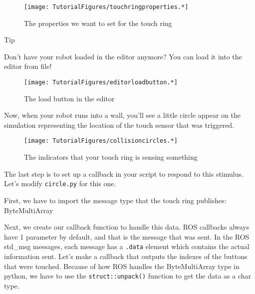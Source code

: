 \begin{figure}
\centering
\texttt{[image: TutorialFigures/touchringproperties.*]}
\caption{The properties we want to set for the touch ring}
\end{figure}

Tip

Don't have your robot loaded in the editor anymore? You can load it into
the editor from file!

\begin{figure}
\centering
\texttt{[image: TutorialFigures/editorloadbutton.*]}
\caption{The load button in the editor}
\end{figure}

Now, when your robot runs into a wall, you'll see a little circle appear
on the simulation representing the location of the touch sensor that was
triggered.

\begin{figure}
\centering
\texttt{[image: TutorialFigures/collisioncircles.*]}
\caption{The indicators that your touch ring is sensing something}
\end{figure}

The last step is to set up a callback in your script to respond to this
stimulus. Let's modify \texttt{circle.py} for this one.

First, we have to import the message type that the touch ring publishes:
ByteMultiArray

\begin{Shaded}
\begin{Highlighting}[]
\end{Highlighting}
\end{Shaded}

Next, we create our callback function to handle this data. ROS callbacks
always have 1 parameter by default, and that is the message that was
sent. In the ROS std\_msg messages, each message has a \texttt{.data}
element which contains the actual information sent. Let's make a
callback that outputs the indexes of the buttons that were touched.
Because of how ROS handles the ByteMultiArray type in python, we have to
use the \texttt{struct::unpack()} function to get the data as a char
type.

